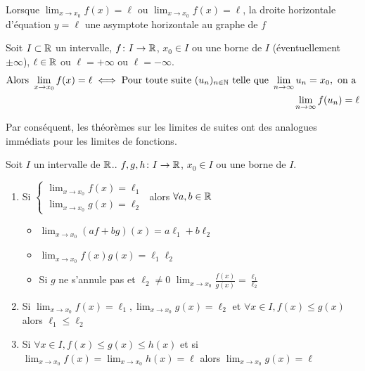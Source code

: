 \begin{remarque}
    Lorsque $\displaystyle \lim_{x \to x_0} f(x) = \ell \text{ ou } \lim_{x \to x_0} f(x) = \ell$, la droite horizontale d'équation $y = \ell$ une asymptote horizontale au graphe de $f$
\end{remarque}

\begin{graybox}
    \begin{theoreme}
        Soit $I \subset \mathbb{R}$ un intervalle, $f \colon I \to \mathbb{R}$, $x_0 \in I$ ou une borne de $I$ (éventuellement $\pm \infty$), $\ell \in \mathbb{R}$ ou $\ell = +\infty$ ou $\ell = -\infty$.     
    \begin{align*}
        \text{Alors } \lim_{x \to x_0} f(x) = \ell \iff \text{Pour toute suite } (u_n)_{n \in \mathbb{N}} \text{ telle que } \lim_{n \to \infty} u_n = x_0, \text{ on a } \\ \lim_{n \to \infty} f(u_n) = \ell
    \end{align*}
    \end{theoreme}
\end{graybox}

\par Par conséquent, les théorèmes sur les limites de suites ont des analogues immédiats pour les limites de fonctions.

\begin{graybox}
\begin{theoreme}
Soit $I$ un intervalle de $\mathbb{R}$.. $f, g, h \colon I \to \mathbb{R}$, $x_0 \in I$ ou une borne de $I$.
\begin{enumerate}
\item Si 
$
\begin{cases}
\lim_{x \to x_0} f(x) = \ell_1 \\
\lim_{x \to x_0} g(x) = \ell_2
\end{cases}
$
alors $\forall a, b \in \mathbb{R}$
\begin{itemize}
\item $\lim_{x \to x_0} (af + bg) (x) = a \ell_1 + b \ell_2$
\item $\lim_{x \to x_0} f(x)g(x) = \ell_1 \ell_2$
\item Si $g$ ne s'annule pas et $\ell_2 \neq 0$ $\lim_{x \to x_0} \frac{f(x)}{g(x)} = \frac{\ell_1}{\ell_2}$
\end{itemize}
\item Si $\lim_{x \to x_0} f(x) = \ell_1, \lim_{x \to x_0}g(x) = \ell_2$ et $\forall x \in I, f(x) \leq g(x)$ alors $\ell_1 \leq \ell_2$
\item Si $\forall x \in I, f(x) \leq g(x) \leq h(x)$ et si $\lim_{x \to x_0} f(x) = \lim_{x \to x_0} h(x) = \ell$ alors $\lim_{x \to x_0} g(x) = \ell$
\end{enumerate}
\end{theoreme}
\end{graybox}

